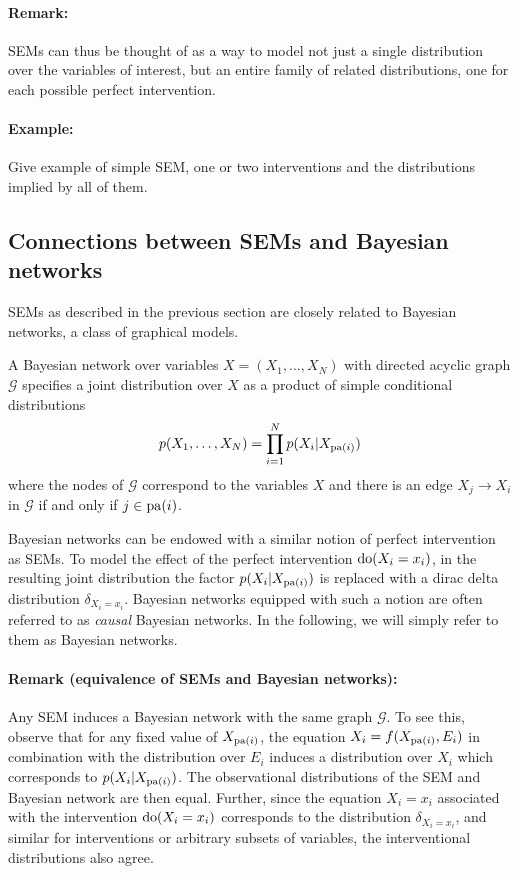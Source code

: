 \paragraph{Remark:} SEMs can thus be thought of as a way to model not just a single distribution over the variables of interest, but an entire family of related distributions, one for each possible perfect intervention.


\paragraph{Example:} Give example of simple SEM, one or two interventions and the distributions implied by all of them.

\subsection{Connections between SEMs and Bayesian networks}

SEMs as described in the previous section are closely related to Bayesian networks, a class of graphical models.
\begin{definition}
A Bayesian network over variables $X = (X_1,\ldots, X_N)$ with directed acyclic graph $\mathcal{G}$ specifies a joint distribution over $X$ as a product of simple conditional distributions
\begin{align*}
	p(X_1,\ldots,X_N) = \prod_{i=1}^N p(X_i | X_{\operatorname{pa}(i)})
\end{align*}
where the nodes of $\mathcal{G}$ correspond to the variables $X$ and there is an edge $X_j \to X_i$ in $\mathcal{G}$ if and only if $j \in \operatorname{pa}(i)$.
\end{definition}


Bayesian networks can be endowed with a similar notion of perfect intervention as SEMs. To model the effect of the perfect intervention $\operatorname{do}(X_i = x_i)$, in the resulting joint distribution the factor $p(X_i | X_{\operatorname{pa}(i)})$ is replaced with a dirac delta distribution $\delta_{X_i = x_i}$. 
Bayesian networks equipped with such a notion are often referred to as \emph{causal} Bayesian networks. 
In the following, we will simply refer to them as Bayesian networks.


\paragraph{Remark (equivalence of SEMs and Bayesian networks):} Any SEM induces a Bayesian network with the same graph $\mathcal{G}$.
To see this, observe that for any fixed value of $X_{\operatorname{pa}(i)}$, the equation $X_i = f(X_{\operatorname{pa}(i)} , E_i)$ in combination with the distribution over $E_i$ induces a distribution over $X_i$ which corresponds to $p(X_i | X_{\operatorname{pa}(i)})$. The observational distributions of the SEM and Bayesian network are then equal. Further, since the equation $X_i=x_i$ associated with the intervention $\operatorname{do}(X_i = x_i)$ corresponds to the distribution $\delta_{X_i = x_i}$, and similar for interventions or arbitrary subsets of variables, the interventional distributions also agree.

